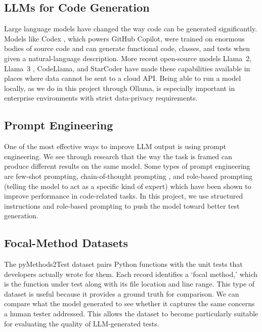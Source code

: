 \documentclass[conference]{IEEEtran}
\begin{document}
\subsection{LLMs for Code Generation}

Large language models have changed the way code can be generated significantly. Models like Codex \cite{chen2021codex}, which powers GitHub Copilot, were trained on enormous bodies of source code and can generate functional code, classes, and tests when given a natural-language description. More recent open-source models Llama~2, Llama~3 \cite{touvron2023llama}, CodeLlama, and StarCoder \cite{li2023starcoder} have made these capabilities available in places where data cannot be sent to a cloud API. Being able to run a model locally, as we do in this project through Ollama, is especially important in enterprise environments with strict data-privacy requirements.

\subsection{Prompt Engineering}

One of the most effective ways to improve LLM output is using prompt engineering. We see through research that the way the task is framed can produce different results on the same model. Some types of prompt engineering are few-shot prompting, chain-of-thought prompting \cite{wei2022chain}, and role-based prompting (telling the model to act as a specific kind of expert) which have been shown to improve performance in code-related tasks. In this project, we use structured instructions and role-based prompting to push the model toward better test generation.

\subsection{Focal-Method Datasets}

The pyMethods2Test dataset \cite{tufano2022methods2test} pairs Python functions with the unit tests that developers actually wrote for them. Each record identifies a `focal method,' which is the function under test along with its file location and line range. This type of dataset is useful because it provides a ground truth for comparison. We can compare what the model generated to see whether it captures the same concerns a human tester addressed. This allows the dataset to become particularly suitable for evaluating the quality of LLM-generated tests.
\end{document}
